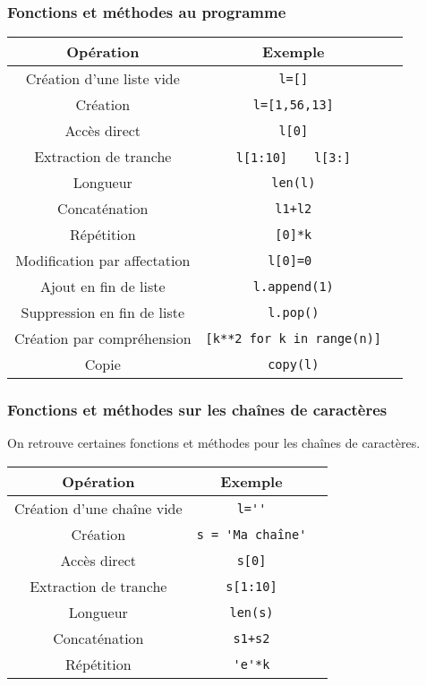 \subsubsection*{Fonctions et méthodes au programme}

\begin{tabular}{|c|c|c|}
  \hline
  Opération & Exemple \\
  \hline 
  \hline 
  Création d'une liste vide & \verb+l=[]+ \\
  \hline 
   Création  & \verb+l=[1,56,13]+ \\
  \hline 
  Accès direct & \verb+l[0]+ \\
    \hline
  Extraction de tranche & \verb+l[1:10]   +   \verb+l[3:]+ \\
  \hline
  Longueur & \verb+len(l)+ \\
  \hline
  Concaténation & \verb-l1+l2- \\
    \hline
  Répétition & \verb+[0]*k+\\
  \hline
  Modification par affectation & \verb?l[0]=0 ?\\
  \hline
  Ajout en fin de liste & \verb+l.append(1)+ \\
  \hline
  Suppression en fin de liste & \verb+l.pop()+ \\
  \hline
  Création par compréhension & \verb+[k**2 for k in range(n)]+ \\
  \hline
  Copie & \verb+copy(l)+ \\
  \hline
\end{tabular}

\subsubsection*{Fonctions et méthodes sur les chaînes de caractères}
On retrouve certaines fonctions et méthodes pour les chaînes de caractères.

\begin{tabular}{|c|c|c|}
  \hline
  Opération & Exemple  \\
  \hline 
  \hline
  Création d'une chaîne vide & \verb+l=''+ \\
      \hline 
  Création & \verb+s = 'Ma chaîne'+ \\
  \hline
  Accès direct & \verb+s[0]+ \\
    \hline
  Extraction de tranche & \verb+s[1:10]+ \\
  \hline
  Longueur & \verb+len(s)+\\
  \hline
  Concaténation & \verb-s1+s2- \\
      \hline
  Répétition & \verb+'e'*k+\\
  \hline
\end{tabular}












